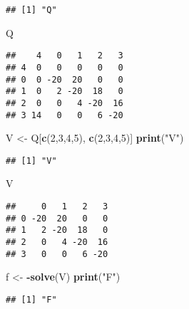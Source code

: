 \documentclass[]{article}
\newenvironment{Shaded}{\begin{snugshade}}{\end{snugshade}}
\newcommand{\DecValTok}[1]{\textcolor[rgb]{0.00,0.00,0.81}{#1}}
\newcommand{\KeywordTok}[1]{\textcolor[rgb]{0.13,0.29,0.53}{\textbf{#1}}}
\newcommand{\NormalTok}[1]{#1}
\newcommand{\OperatorTok}[1]{\textcolor[rgb]{0.81,0.36,0.00}{\textbf{#1}}}
\newcommand{\StringTok}[1]{\textcolor[rgb]{0.31,0.60,0.02}{#1}}
\begin{document}
\begin{verbatim}
## [1] "Q"
\end{verbatim}

\begin{Shaded}
\begin{Highlighting}[]
\NormalTok{Q}
\end{Highlighting}
\end{Shaded}

\begin{verbatim}
##    4   0   1   2   3
## 4  0   0   0   0   0
## 0  0 -20  20   0   0
## 1  0   2 -20  18   0
## 2  0   0   4 -20  16
## 3 14   0   0   6 -20
\end{verbatim}

\begin{Shaded}
\begin{Highlighting}[]
\NormalTok{V <-}\StringTok{ }\NormalTok{Q[}\KeywordTok{c}\NormalTok{(}\DecValTok{2}\NormalTok{,}\DecValTok{3}\NormalTok{,}\DecValTok{4}\NormalTok{,}\DecValTok{5}\NormalTok{), }\KeywordTok{c}\NormalTok{(}\DecValTok{2}\NormalTok{,}\DecValTok{3}\NormalTok{,}\DecValTok{4}\NormalTok{,}\DecValTok{5}\NormalTok{)]}
\KeywordTok{print}\NormalTok{(}\StringTok{"V"}\NormalTok{)}
\end{Highlighting}
\end{Shaded}

\begin{verbatim}
## [1] "V"
\end{verbatim}

\begin{Shaded}
\begin{Highlighting}[]
\NormalTok{V}
\end{Highlighting}
\end{Shaded}

\begin{verbatim}
##     0   1   2   3
## 0 -20  20   0   0
## 1   2 -20  18   0
## 2   0   4 -20  16
## 3   0   0   6 -20
\end{verbatim}

\begin{Shaded}
\begin{Highlighting}[]
\NormalTok{f <-}\StringTok{ }\OperatorTok{-}\KeywordTok{solve}\NormalTok{(V)}
\KeywordTok{print}\NormalTok{(}\StringTok{"F"}\NormalTok{)}
\end{Highlighting}
\end{Shaded}

\begin{verbatim}
## [1] "F"
\end{verbatim}
\end{document}
